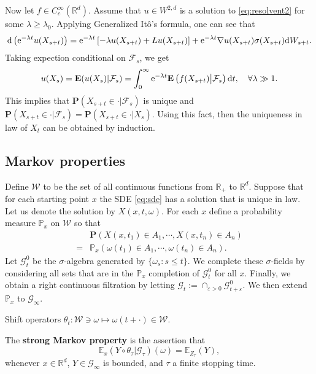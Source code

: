 \documentclass[twoside, 12pt]{book}
\numberwithin{equation}{chapter}
\def\cF{{\mathcal F}}
\def\cG{{\mathcal G}}
\def\cW{{\mathcal W}}
\def\mE{{\mathbb E}}
\def\mP{{\mathbb P}}
\def\mR{{\mathbb R}}
\def\bE{{\mathbf E}}
\def\bP{{\mathbf P}}
\def\l{\left}
\def\r{\right}
\def\geq{\geqslant}
\def\leq{\leqslant}
\def\d{\text{\rm{d}}}
\def\e{\mathrm{e}}
\def\eps{\varepsilon}
\begin{document}
	Now let $f\in C_c^\infty(\mR^d)$. Assume that $u\in W^{2,d}$ is a solution to \eqref{eq:resolvent2} for some $\lambda\geq \lambda_0$.  Applying Generalized It\^o's formula, one can see that 
	\begin{align*}
		\d \l(\e^{-\lambda t} u(X_{s+t}) \r)=  \e^{-\lambda t} \l[-\lambda u(X_{s+t}) + Lu(X_{s+t})\r] + \e^{-\lambda t} \nabla u(X_{s+t}) \sigma (X_{s+t})\d W_{s+t}. 
	\end{align*}
	Taking expection conditional on $\cF_s$, we get 
	\[
	    u(X_s) =\bE(u(X_s)| \cF_s)=  \int_0^\infty \e^{-\lambda t}\bE \l(  f(X_{s+t})   \big | \cF_s \r) \d t,\quad \forall \lambda \gg 1. 
	\]
    This implies that $\bP (X_{s+t}\in \cdot| \cF_s)$ is unique and $\bP (X_{s+t}\in \cdot| \cF_s)=\bP (X_{s+t}\in \cdot| X_s)$. Using this fact, then the uniqueness in law of $X_t$ can be obtained by induction. 

	\subsection{Markov properties}
	Define $\cW$ to be the set of all continuous functions from $\mR_+$ to $\mR^d$. Suppose that for each starting point $x$ the SDE \eqref{eq:sde} has a solution that is unique in law. Let us denote the solution by $X(x, t, \omega)$. For each $x$ define a probability measure $\mP_x$ on $\cW$ so that
	\begin{align*}
		&\bP \l(X(x, t_1)\in A_1,\cdots, X(x, t_n)\in A_n\r)\\
		=&\mP_x(\omega({t_1})\in A_1,\cdots, \omega({t_n})\in A_n). 
	\end{align*}
	Let $\cG^0_t$ be the $\sigma$-algebra generated by $\{\omega_s: s\leq t\}$. We complete these $\sigma$-fields by considering all sets that are in the $\mP_x$ completion of $\cG^0_t$ for all $x$. %
	Finally, we obtain a right continuous filtration by letting $\cG_t:=\cap_{\eps>0} \cG_{t+\eps}^0$. We then extend $\mP_x$ to $\cG_\infty$.
	
	Shift operators $\theta_t: \cW\ni \omega \mapsto \omega(t+\cdot)\in\cW$. 
	
	The {\bf strong Markov property} is the assertion that 
	$$
	\mE_x(Y\circ\theta_{\tau}|\cG_\tau)(\omega)=\mE_{Z_\tau}(Y), 
	$$
	whenever $x\in \mR^d$, $Y\in \cG_\infty$ is bounded, and $\tau$ a finite stopping time. 
	
\end{document}
